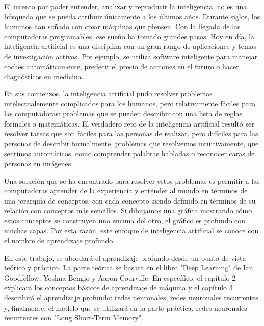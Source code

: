 \noindent
El intento por poder entender, analizar y reproducir la inteligencia, no es una búsqueda que se pueda atribuir únicamente a los últimos años. Durante siglos, los humanos han soñado con crear máquinas que piensen. Con la llegada de las computadoras programables, ese sueño ha tomado grandes pasos. Hoy en día, la inteligencia artificial es una disciplina con un gran rango de aplicaciones y temas de investigación activos. Por ejemplo, se utiliza software inteligente para manejar coches automáticamente, predecir el precio de acciones en el futuro o hacer diagnósticos en medicina. \cite{goodfellow-et-al-2016}  \cite{hastie01statisticallearning}
\cite{Haugeland:1985:AIV:4694}

\vspace{1em}

En sus comienzos, la inteligencia artificial pudo resolver problemas intelectualemente complicados para los humanos, pero relativamente fáciles para las computadoras: problemas que se pueden describir con una lista de reglas formales o matemáticas. El verdadero reto de la inteligencia artificial resultó ser resolver tareas que son fáciles para las personas de realizar, pero difíciles para las personas de describir formalmente, problemas que resolvemos intuitivamente, que sentimos automáticos, como comprender palabras habladas o reconocer caras de personas en imágenes. 
\cite{goodfellow-et-al-2016}

\vspace{1em}

Una solución que se ha encontrado para resolver estos problemas es permitir a las computadoras aprender de la experiencia y entender al mundo en términos de una jerarquía de conceptos, con cada concepto siendo definido en términos de su relación con conceptos más sencillos. Si dibujamos una gráfica mostrando cómo estos conceptos se construyen uno encima del otro, el gráfico es profundo con muchas capas. Por esta razón, este enfoque de inteligencia artificial se conoce con el nombre de aprendizaje profundo. 
\cite{deep-learning-methods-and-applications}
\cite{goodfellow-et-al-2016}

\vspace{1em}

En este trabajo, se abordará el aprendizaje profundo desde un punto de vista teórico y práctico. La parte teórica se basará en el libro "Deep Learning" de Ian Goodfellow, Yoshua Bengio y Aaron Courville. En específico, el capítulo 2 explicará los conceptos básicos de aprendizaje de máquina y el capítulo 3 describirá el aprendizaje profundo: redes neuronales, redes neuronales recurrentes y, finalmente, el modelo que se utilizará en la parte práctica, redes neuronales recurrentes con "Long Short-Term Memory".


